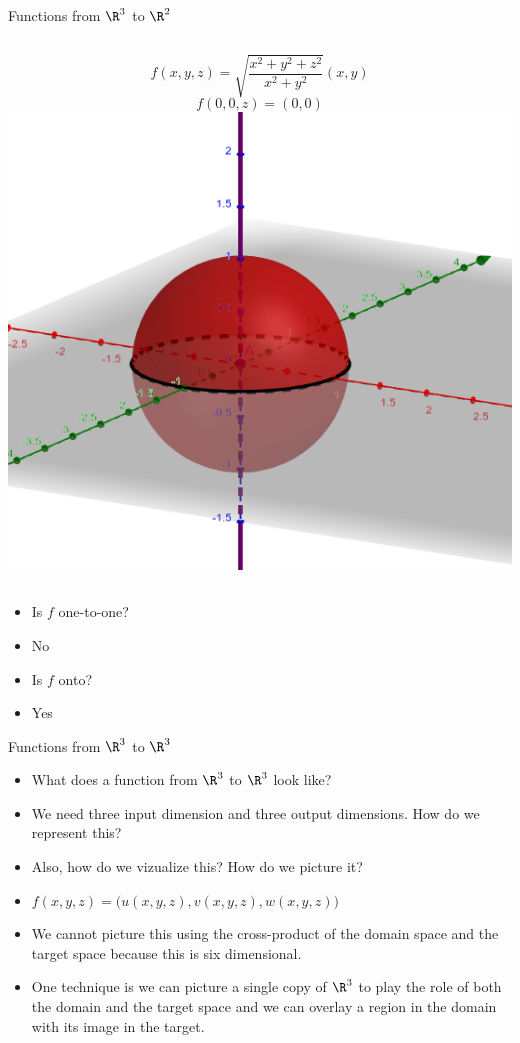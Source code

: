 \documentclass{beamer}
\begin{document}
\begin{frame}{Functions from $\R^3$ to $\R^2$}

\begin{columns}
\column[T]{5cm}
$$f(x,y, z) = \sqrt{\frac{x^2 + y^2 + z^2}{x^2+y^2}}(x, y)$$
$$f(0,0, z) = (0,0)$$
\column[T]{5cm}
\includegraphics[scale=0.25]{sphere2}
\end{columns}

\begin{itemize}
\item Is $f$ one-to-one?
\item No
\item Is $f$ onto?
\item Yes
\end{itemize}
\end{frame}

\begin{frame}{Functions from $\R^3$ to $\R^3$}

\begin{itemize}
\item What does a function from $\R^3$ to $\R^3$ look like?
\item We need three input dimension and three output dimensions.
How do we represent this?
\item Also, how do we vizualize this? How do we picture it?
\item $f(x,y,z) = \big( u(x,y,z), v(x,y,z), w(x,y,z)\big)$
\item We cannot picture this using the cross-product of the domain space
and the target space because this is six dimensional.
\item One technique is we can picture a single copy of $\R^3$ to play
the role of both the domain and the target space and we can overlay
a region in the domain with its image in the target.
\end{itemize}
\end{frame}
\end{document}

